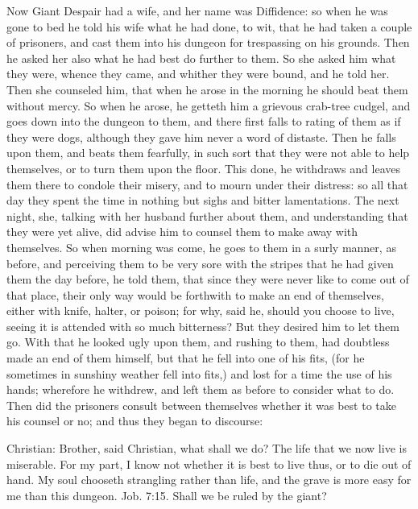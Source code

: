 Now Giant Despair had a wife, and her name was Diffidence: so when he was gone to bed he told his wife what he had done, to wit, that he had taken a couple of prisoners, and cast them into his dungeon for trespassing on his grounds. Then he asked her also what he had best do further to them. So she asked him what they were, whence they came, and whither they were bound, and he told her. Then she counseled him, that when he arose in the morning he should beat them without mercy. So when he arose, he getteth him a grievous crab-tree cudgel, and goes down into the dungeon to them, and there first falls to rating of them as if they were dogs, although they gave him never a word of distaste. Then he falls upon them, and beats them fearfully, in such sort that they were not able to help themselves, or to turn them upon the floor. This done, he withdraws and leaves them there to condole their misery, and to mourn under their distress: so all that day they spent the time in nothing but sighs and bitter lamentations. The next night, she, talking with her husband further about them, and understanding that they were yet alive, did advise him to counsel them to make away with themselves. So when morning was come, he goes to them in a surly manner, as before, and perceiving them to be very sore with the stripes that he had given them the day before, he told them, that since they were never like to come out of that place, their only way would be forthwith to make an end of themselves, either with knife, halter, or poison; for why, said he, should you choose to live, seeing it is attended with so much bitterness? But they desired him to let them go. With that he looked ugly upon them, and rushing to them, had doubtless made an end of them himself, but that he fell into one of his fits, (for he sometimes in sunshiny weather fell into fits,) and lost for a time the use of his hands; wherefore he withdrew, and left them as before to consider what to do. Then did the prisoners consult between themselves whether it was best to take his counsel or no; and thus they began to discourse:

Christian: Brother, said Christian, what shall we do? The life that we now live is miserable. For my part, I know not whether it is best to live thus, or to die out of hand. My soul chooseth strangling rather than life, and the grave is more easy for me than this dungeon. Job. 7:15. Shall we be ruled by the giant?

